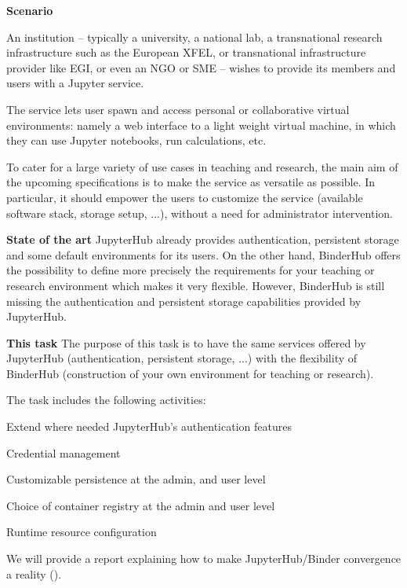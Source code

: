 \begin{task}[
  title=JupyterHub / BinderHub convergence,
  id=jh-bh-conv,
  lead=EP,
  PM=16, %
  wphases={0-36!.5},
  partners={WTT}]

  \textbf{Scenario}

  An institution -- typically a university, a national lab, a transnational
  research infrastructure such as the European XFEL, or transnational
  infrastructure provider like EGI, or even an NGO or SME -- wishes to provide its members and
  users with a Jupyter service.

  The service lets user spawn and access personal or collaborative virtual
  environments: namely a web interface to a light weight virtual machine,
  in which they can use Jupyter notebooks, run calculations, etc.

  To cater for a large variety of use cases in teaching and research,
  the main aim of the upcoming specifications is to make the service as
  versatile as possible. In particular, it should empower the users to 
  customize the service (available software stack, storage setup, ...),
  without a need for administrator intervention.

  \textbf{State of the art}
  JupyterHub already provides authentication, persistent storage and some
  default environments for its users. On the other hand, BinderHub offers
  the possibility to define more precisely the requirements for your teaching
  or research environment which makes it very flexible. However, BinderHub is still missing the  
  authentication and persistent storage capabilities provided by JupyterHub.

  \textbf{This task}
  The purpose of this task is to have the same services offered by JupyterHub
  (authentication, persistent storage, ...) with the flexibility of BinderHub
  (construction of your own environment for teaching or research).

  The task includes the following activities:
  \begin{compactitem}
  \item Extend where needed JupyterHub's authentication features%
  \item Credential management
  \item Customizable persistence at the admin, and user level
  \item Choice of container registry at the admin and user level %
  \item Runtime resource configuration %
  \end{compactitem}
  We will provide a report explaining how to make JupyterHub/Binder convergence a reality ().
\end{task}
